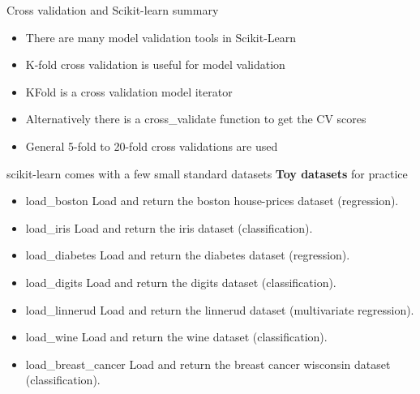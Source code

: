 \documentclass[10pt]{beamer}
\begin{document}
\begin{frame}{Cross validation and Scikit-learn summary}
\begin{itemize}
\item There are many model validation tools in Scikit-Learn
\item K-fold cross validation is useful for model validation
\item KFold is a cross validation model iterator
\item Alternatively there is a cross\_validate function to get the CV scores
\item General 5-fold to 20-fold cross validations are used
\end{itemize}
\end{frame}


\begin{frame}{scikit-learn comes with a few small standard datasets}
\textbf{Toy datasets} for practice
\begin{itemize}
\item load\_boston	Load and return the boston house-prices dataset (regression).
\item load\_iris	Load and return the iris dataset (classification).
\item load\_diabetes 	Load and return the diabetes dataset (regression).
\item load\_digits	Load and return the digits dataset (classification).
\item load\_linnerud 	Load and return the linnerud dataset (multivariate regression).
\item load\_wine 	Load and return the wine dataset (classification).
\item load\_breast\_cancer	Load and return the breast cancer wisconsin dataset (classification).
\end{itemize}
\end{frame}

\end{document}
